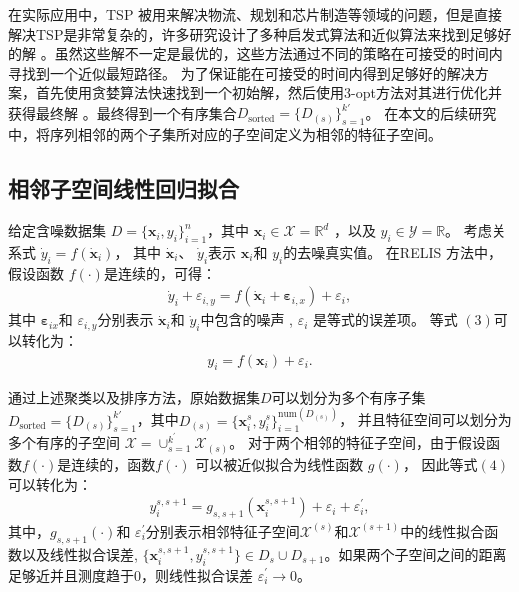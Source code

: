 \documentclass[12pt,a4paper]{article}%
\begin{document}
	在实际应用中，TSP 被用来解决物流、规划和芯片制造等领域的问题，但是直接解决TSP是非常复杂的，许多研究设计了多种启发式算法和近似算法来找到足够好的解 \cite{bib15,bib16}。虽然这些解不一定是最优的，这些方法通过不同的策略在可接受的时间内寻找到一个近似最短路径。
	为了保证能在可接受的时间内得到足够好的解决方案，首先使用贪婪算法快速找到一个初始解，然后使用3-opt方法对其进行优化并获得最终解 \cite{bib17,bib18}。最终得到一个有序集合$D_\text{sorted}=\{D_{(s)}\}_{s=1}^{k'}$。 
	在本文的后续研究中，将序列相邻的两个子集所对应的子空间定义为相邻的特征子空间。

	\subsection{相邻子空间线性回归拟合}

	给定含噪数据集 $D=\{\boldsymbol{x}_i,y_i\}_{i=1}^n$，其中 $\boldsymbol{x}_i\in \mathcal{X}=\mathbb{R}^d$ ，以及 $y_i\in\mathcal{Y}=\mathbb{R}$。 考虑关系式 $\dot{y}_i=f(\dot{\boldsymbol{x}}_i)$，
	其中 $\dot{\boldsymbol{x}}_i$、 $\dot{y}_i$表示 $\boldsymbol{x}_i$和 $y_i$的去噪真实值。 在RELIS 方法中，假设函数 $f(\cdot)$是连续的，可得：
	\begin{align} \dot{y}_i+\varepsilon_{i,y}=f(\dot{\boldsymbol{x}}_i+\boldsymbol{\varepsilon}_{i,x})+\varepsilon_i, \end{align}
	其中 $\boldsymbol{\varepsilon}_{ix}$和 $\varepsilon_{i,y}$分别表示 $\dot{\boldsymbol{x}}_i$和 $\dot{y}_i$中包含的噪声 , $\varepsilon_i$ 是等式的误差项。 等式 $(3)$可以转化为：
	\begin{align} y_i=f(\boldsymbol{x}_i)+\varepsilon_i. \end{align}
	
	通过上述聚类以及排序方法，原始数据集$D$可以划分为多个有序子集 $D_\text{sorted}=\{D_{(s)}\}_{s=1}^{k'}$，其中$D_{(s)}=\{ \boldsymbol{x}_i^s,y_i^s \}_{i=1}^{\text{num}(D_{(s)})}$，
	并且特征空间可以划分为多个有序的子空间 $\mathcal{X}=\cup_{s=1}^{k^\prime}\mathcal{X}_{(s)}$。 对于两个相邻的特征子空间，由于假设函数$f(\cdot)$是连续的，函数$f(\cdot)$ 可以被近似拟合为线性函数 $g(\cdot)$，
	因此等式$(4)$可以转化为：
	\begin{align} y_i^{s,s+1}=g_{s,s+1}(\boldsymbol{x}_i^{s,s+1})+\varepsilon_i+\varepsilon_i^\prime, \end{align}
	其中，$g_{s,s+1}(\cdot)$和 $\varepsilon_i^\prime$分别表示相邻特征子空间$\mathcal{X}^{(s)}$和$\mathcal{X}^{(s+1)}$中的线性拟合函数以及线性拟合误差, 
	$\{\boldsymbol{x}_i^{s,s+1},y_i^{s,s+1}\}\in D_s\cup D_{s+1}$。如果两个子空间之间的距离足够近并且测度趋于0，则线性拟合误差 $\varepsilon_i^\prime\rightarrow0$。
\end{document}
